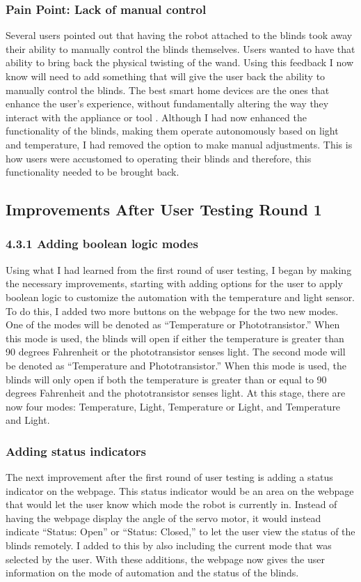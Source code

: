 \documentclass[10pt,twocolumn]{article}
\begin{document}
\subsubsection{Pain Point: Lack of manual control}
Several users pointed out that having the robot attached to the blinds took away their ability to manually control the blinds themselves. Users wanted to have that ability to bring back the physical twisting of the wand. Using this feedback I now know will need to add something that will give the user back the ability to manually control the blinds. The best smart home devices are the ones that enhance the user’s experience, without fundamentally altering the way they interact with the appliance or tool \cite{Tamayo2022SmartHome}. Although I had now enhanced the functionality of the blinds, making them operate autonomously based on light and temperature, I had removed the option to make manual adjustments. This is how users were accustomed to operating their blinds and therefore, this functionality needed to be brought back.

\subsection{Improvements After User Testing Round 1}
\subsubsection{4.3.1 Adding boolean logic modes}
Using what I had learned from the first round of user testing, I began by making the necessary improvements, starting with adding options for the user to apply boolean logic to customize the automation with the temperature and light sensor. To do this, I added two more buttons on the webpage for the two new modes. One of the modes will be denoted as “Temperature or Phototransistor.” When this mode is used, the blinds will open if either the temperature is greater than 90 degrees Fahrenheit or the phototransistor senses light. The second mode will be denoted as “Temperature and Phototransistor.” When this mode is used, the blinds will only open if both the temperature is greater than or equal to 90 degrees Fahrenheit and the phototransistor senses light. At this stage, there are now four modes: Temperature, Light, Temperature or Light, and Temperature and Light.

\subsubsection{Adding status indicators}
The next improvement after the first round of user testing is adding a status indicator on the webpage. This status indicator would be an area on the webpage that would let the user know which mode the robot is currently in. Instead of having the webpage display the angle of the servo motor, it would instead indicate “Status: Open” or “Status: Closed,” to let the user view the status of the blinds remotely. I added to this by also including the current mode that was selected by the user. With these additions, the webpage now gives the user information on the mode of automation and the status of the blinds.
\end{document}
